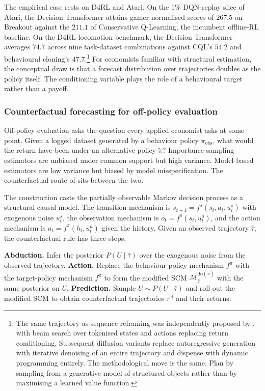 The empirical case rests on D4RL and Atari. On the $1\%$ DQN-replay slice
of Atari, the Decision Transformer attains gamer-normalised scores of
$267.5$ on Breakout against the $211.1$ of Conservative Q-Learning, the
incumbent offline-RL baseline. On the D4RL locomotion benchmark, the
Decision Transformer averages $74.7$ across nine task-dataset
combinations against CQL's $54.2$ and behavioural cloning's
$47.7$.\footnote{The same trajectory-as-sequence reframing was independently
proposed by \citet{Janner2021TT}, with beam search over tokenised states
and actions replacing return conditioning. Subsequent diffusion variants
\citep{Janner2022diffuser,Ajay2023} replace autoregressive generation with
iterative denoising of an entire trajectory and dispense with dynamic
programming entirely. The methodological move is the same. Plan by
sampling from a generative model of structured objects rather than by
maximising a learned value function.} For economists familiar with
structural estimation, the conceptual draw is that a forecast distribution
over trajectories doubles as the policy itself. The conditioning variable
plays the role of a behavioural target rather than a payoff.

\subsubsection{Counterfactual forecasting for off-policy evaluation}
\label{sec:counterfactual_ope}

Off-policy evaluation asks the question every applied economist asks at
some point. Given a logged dataset generated by a behaviour policy
$\pi_{\mathrm{obs}}$, what would the return have been under an alternative
policy $\widetilde\pi$? Importance sampling estimators are unbiased under
common support but high variance. Model-based estimators are low variance
but biased by model misspecification. The counterfactual route of
\citet{Buesing2019} sits between the two.

The construction casts the partially observable Markov decision process as
a structural causal model. The transition mechanism is
$s_{t+1} = f^s(s_t, a_t, u^s_t)$ with exogenous noise $u^s_t$, the
observation mechanism is $o_t = f^o(s_t, u^o_t)$, and the action
mechanism is $a_t = f^\pi(h_t, u^a_t)$ given the history. Given an
observed trajectory $\hat\tau$, the counterfactual rule has three steps.

\begin{algorithm}[h]
\caption{Counterfactual off-policy evaluation \citep{Buesing2019}}
\label{alg:buesing_cfope}
\begin{algorithmic}[1]
\State \textbf{Abduction.} Infer the posterior $P(U \mid \hat\tau)$ over the
exogenous noise from the observed trajectory.
\State \textbf{Action.} Replace the behaviour-policy mechanism $f^\pi$ with
the target-policy mechanism $f^{\widetilde\pi}$ to form the modified SCM
$\mathcal M^{\mathrm{do}(\widetilde\pi)}_{\hat\tau}$ with the same posterior
on $U$.
\State \textbf{Prediction.} Sample $U \sim P(U \mid \hat\tau)$ and roll out
the modified SCM to obtain counterfactual trajectories $\tau^{\mathrm{cf}}$
and their returns.
\end{algorithmic}
\end{algorithm}

